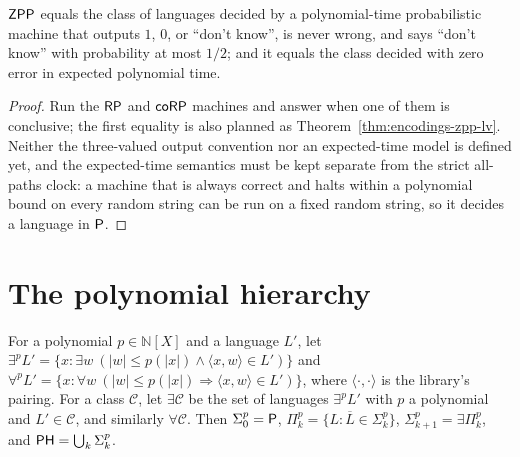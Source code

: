 \begin{theorem}
  \label{thm:randomness-zpp-las-vegas}
  \notready
  $\mathsf{ZPP}$ equals the class of languages decided by a polynomial-time
  probabilistic machine that outputs $1$, $0$, or ``don't know'', is never
  wrong, and says ``don't know'' with probability at most $1/2$; and it equals
  the class decided with zero error in expected polynomial time.
\end{theorem}
\begin{proof}
  Run the $\mathsf{RP}$ and $\mathsf{coRP}$ machines and answer when one of them is
  conclusive; the first equality is also planned as
  Theorem~\ref{thm:encodings-zpp-lv}. Neither the three-valued output
  convention nor an expected-time model is defined yet, and the expected-time
  semantics must be kept separate from the strict all-paths clock: a machine
  that is always correct and halts within a polynomial bound on every random
  string can be run on a fixed random string, so it decides a language in
  $\mathsf{P}$.
\end{proof}

\section{The polynomial hierarchy}

\begin{definition}
  \label{def:PH}
  \leanok
  For a polynomial $p \in \mathbb{N}[X]$ and a language $L'$, let
  $\exists^p L' = \{x : \exists w\ (|w| \le p(|x|) \wedge \langle x, w \rangle
  \in L')\}$ and $\forall^p L' = \{x : \forall w\ (|w| \le p(|x|) \Rightarrow
  \langle x, w \rangle \in L')\}$, where $\langle \cdot, \cdot \rangle$ is the
  library's pairing. For a class $\mathcal{C}$, let
  $\exists \mathcal{C}$ be the set of languages $\exists^p L'$ with $p$ a
  polynomial and $L' \in \mathcal{C}$, and similarly $\forall \mathcal{C}$.
  Then
  $\Sigma^p_0 = \mathsf{P}$, $\Pi^p_k = \{L : \overline{L} \in \Sigma^p_k\}$,
  $\Sigma^p_{k+1} = \exists \Pi^p_k$, and
  $\mathsf{PH} = \bigcup_k \Sigma^p_k$.
\end{definition}

